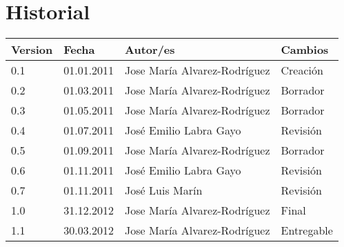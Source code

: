 \chapter*{Historial}
\thispagestyle{empty}

\begin{tabular}{|p{1.3cm}|p{2cm}|p{7cm}|p{3cm}|}  \hline
Version & Fecha & Autor/es & Cambios \\ \hline \hline
0.1 & 01.01.2011 & Jose María Alvarez-Rodríguez & Creación  \\
0.2 & 01.03.2011 & Jose María Alvarez-Rodríguez& Borrador \\
0.3 & 01.05.2011 & Jose María Alvarez-Rodríguez& Borrador \\
0.4 & 01.07.2011 & José Emilio Labra Gayo & Revisión  \\
0.5 & 01.09.2011 & Jose María Alvarez-Rodríguez& Borrador \\
0.6 & 01.11.2011 & José Emilio Labra Gayo & Revisión  \\
0.7 & 01.11.2011 & José Luis Marín & Revisión \\
1.0 & 31.12.2012 & Jose María Alvarez-Rodríguez & Final \\
1.1 & 30.03.2012 & Jose María Alvarez-Rodríguez & Entregable \\
\hline
\end{tabular}
